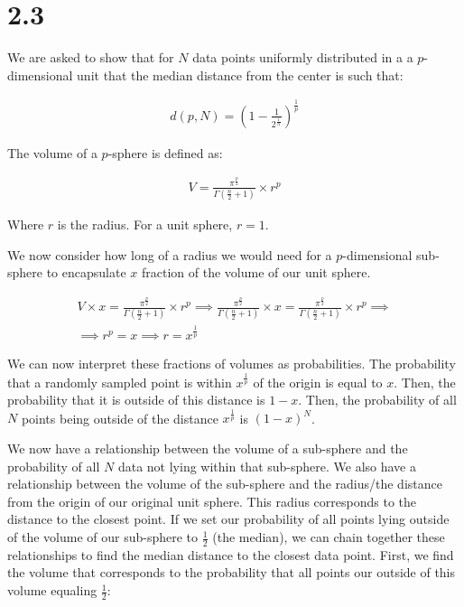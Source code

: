 \section*{2.3}

\noindent
We are asked to show that for $N$ data points uniformly distributed in a a 
$p$-dimensional unit that the median distance from the center is such that:

\begin{gather*}
d(p, N) = (1 - \frac{1}{2^{\frac{1}{N}}})^{\frac{1}{p}}
\end{gather*}

\noindent
The volume of a $p$-sphere is defined as:

\begin{gather*}
V = \frac{\pi^{\frac{p}{2}}}{\Gamma(\frac{n}{2} + 1)} \times r^{p}
\end{gather*}

\noindent
Where $r$ is the radius. For a unit sphere, $r = 1$.

\vspace{5mm}
\noindent
We now consider how long of a radius we would need for a $p$-dimensional 
sub-sphere to encapsulate $x$ fraction of the volume of our unit sphere.

\begin{gather*}
V \times x = 
\frac{\pi^{\frac{p}{2}}}{\Gamma(\frac{n}{2} + 1)} \times r^{p} \implies 
\frac{\pi^{\frac{p}{2}}}{\Gamma(\frac{n}{2} + 1)} \times x = 
\frac{\pi^{\frac{p}{2}}}{\Gamma(\frac{n}{2} + 1)} \times r^{p} \implies \\ 
\implies
r^{p} = x \implies 
r = x^{\frac{1}{p}}
\end{gather*}

\noindent
We can now interpret these fractions of volumes as probabilities. The 
probability that a randomly sampled point is within $x^{\frac{1}{p}}$ of the 
origin is equal to $x$. Then, the probability that it is outside of this 
distance is $1 - x$. Then, the probability of all $N$ points being outside of 
the distance $x^{\frac{1}{p}}$ is $(1 - x)^{N}$. 

\vspace{5mm}
\noindent
We now have a relationship between the volume of a sub-sphere and the 
probability of all $N$ data not lying within that sub-sphere. We also have a 
relationship between the volume of the sub-sphere and the radius/the distance 
from the origin of our original unit sphere. This radius corresponds to the 
distance to the closest point. If we set our probability of all points lying 
outside of the volume of our sub-sphere to $\frac{1}{2}$ (the median), we can 
chain together these relationships to find the median distance to the closest 
data point. First, we find the volume that corresponds to the probability that 
all points our outside of this volume equaling $\frac{1}{2}$:

